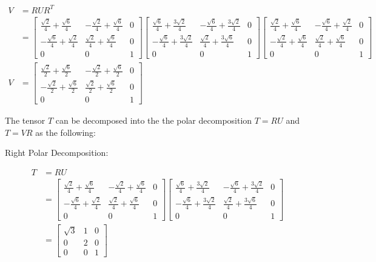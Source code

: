 \begin{align*}
V&=RUR^T\\[10pt]
&=\begin{bmatrix}
\frac{\sqrt{ 2 }}{4}+\frac{\sqrt{ 6 }}{4} & -\frac{\sqrt{ 2 }}{4}+\frac{\sqrt{ 6 }}{4} & 0 \\
-\frac{\sqrt{ 6 }}{4}+\frac{\sqrt{ 2 }}{4} & \frac{\sqrt{ 2 }}{4}+\frac{\sqrt{ 6 }}{4} & 0 \\
0 & 0 & 1
\end{bmatrix}\begin{bmatrix}
\frac{\sqrt{ 6 }}{4}+\frac{3\sqrt{ 2 }}{4} & -\frac{\sqrt{ 6 }}{4}+\frac{3\sqrt{ 2 }}{4} & 0 \\
-\frac{\sqrt{ 6 }}{4}+\frac{3\sqrt{ 2 }}{4} & \frac{\sqrt{ 2 }}{4}+\frac{3\sqrt{ 6 }}{4} & 0 \\
0 & 0 & 1
\end{bmatrix}\begin{bmatrix}
\frac{\sqrt{ 2 }}{4}+\frac{\sqrt{ 6 }}{4} & -\frac{\sqrt{ 6 }}{4}+\frac{\sqrt{ 2 }}{4} & 0 \\
-\frac{\sqrt{ 2 }}{4}+\frac{\sqrt{ 6 }}{4} & \frac{\sqrt{ 2 }}{4}+\frac{\sqrt{ 6 }}{4} & 0 \\
0 & 0 & 1
\end{bmatrix}\\[10pt]
V&=\begin{bmatrix}
\frac{\sqrt{ 2 }}{2}+\frac{\sqrt{ 6 }}{2} & -\frac{\sqrt{ 2 }}{2}+\frac{\sqrt{ 6 }}{2} & 0 \\
-\frac{\sqrt{ 2 }}{2}+\frac{\sqrt{ 6 }}{2} & \frac{\sqrt{ 2 }}{2}+\frac{\sqrt{ 6 }}{2} & 0 \\
0 & 0 & 1
\end{bmatrix}
\end{align*}


The tensor $T$ can be decomposed into the the polar decomposition $T=RU$ and $T=VR$ as the following:

Right Polar Decomposition:

\begin{align*}
T&=RU\\[10pt]
&=\begin{bmatrix}
\frac{\sqrt{ 2 }}{4}+\frac{\sqrt{ 6 }}{4} & -\frac{\sqrt{ 2 }}{4}+\frac{\sqrt{ 6 }}{4} & 0 \\
-\frac{\sqrt{ 6 }}{4}+\frac{\sqrt{ 2 }}{4} & \frac{\sqrt{ 2 }}{4}+\frac{\sqrt{ 6 }}{4} & 0 \\
0 & 0 & 1
\end{bmatrix}\begin{bmatrix}
\frac{\sqrt{ 6 }}{4}+\frac{3\sqrt{ 2 }}{4} & -\frac{\sqrt{ 6 }}{4}+\frac{3\sqrt{ 2 }}{4} & 0 \\
-\frac{\sqrt{ 6 }}{4}+\frac{3\sqrt{ 2 }}{4} & \frac{\sqrt{ 2 }}{4}+\frac{3\sqrt{ 6 }}{4} & 0 \\
0 & 0 & 1
\end{bmatrix}\\[10pt]
&=\begin{bmatrix}
\sqrt{ 3 } & 1 & 0 \\
0 & 2 & 0 \\
0 & 0 & 1
\end{bmatrix}
\end{align*}

